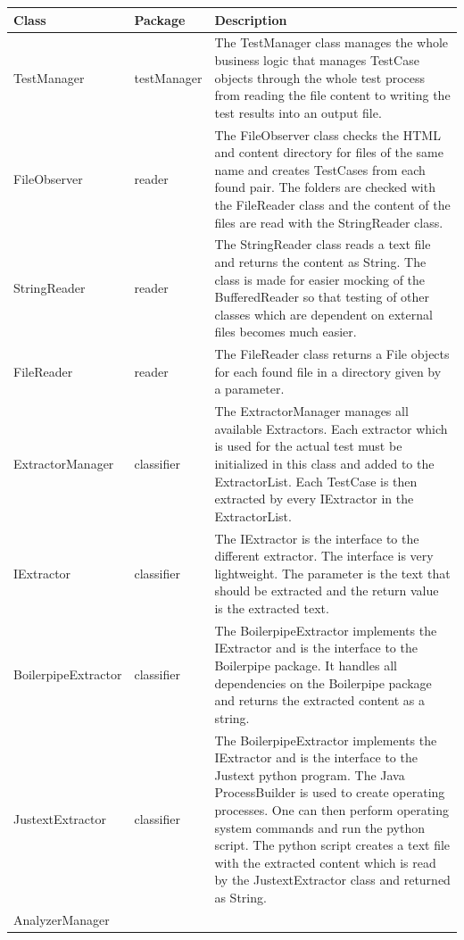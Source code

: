 \begin{longtable}{p{4cm}|p{2cm}|p{8cm}}
\hline
\textbf{Class} &
\textbf{Package} &
\textbf{Description}
 \\ \hline
TestManager &
testManager &
The TestManager class manages the whole business logic that manages TestCase objects through the whole test process from reading the file content to writing the test results into an output file.
 \\ \hline
FileObserver &
reader &
The FileObserver class checks the HTML and content directory for files of the same name and creates TestCases from each found pair. The folders are checked with the FileReader class and the content of the files are read with the StringReader class.
\\ \hline
StringReader &
reader &
The StringReader class reads a text file and returns the content as String. The class is made for easier mocking of the BufferedReader so that testing of other classes which are dependent on external files becomes much easier.
\\ \hline
FileReader &
reader &
The FileReader class returns a File objects for each found file in a directory given by a parameter.
\\ \hline
ExtractorManager &
classifier &
The ExtractorManager manages all available Extractors. Each extractor which is used for the actual test must be initialized in this class and added to the ExtractorList. Each TestCase is then extracted by every IExtractor in the ExtractorList.
\\ \hline
IExtractor &
classifier &
The IExtractor is the interface to the different extractor. The interface is very lightweight. The parameter is the text that should be extracted and the return value is the extracted text.
\\ \hline
BoilerpipeExtractor &
classifier &
The BoilerpipeExtractor implements the IExtractor and is the interface to the Boilerpipe package. It handles all dependencies on the Boilerpipe package and returns the extracted content as a string.
\\ \hline
JustextExtractor &
classifier &
The BoilerpipeExtractor implements the IExtractor and is the interface to the Justext python program. The Java ProcessBuilder is used to create operating processes. One can then perform operating system commands and run the python script. The python script creates a text file with the extracted content which is read by the JustextExtractor class and returned as String.
\\ \hline
AnalyzerManager &          

\end{longtable}
